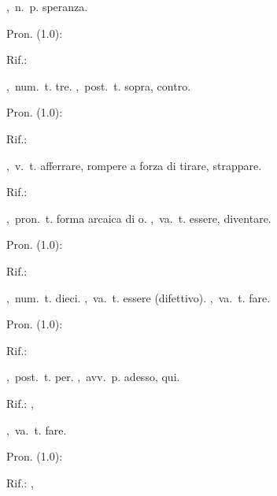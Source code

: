 ,\ n.\ p.
speranza.
\begin{subvocedue}
\item[Pron. (1.0):] 
\item[Rif.:] 
\end{subvocedue}
,\ num.\ t.
tre.
,\ post.\ t.
sopra, contro.
\begin{subvocedue}
\item[Pron. (1.0):] 
\item[Rif.:] 
\end{subvocedue}
,\ v.\ t.
afferrare, rompere a forza di tirare, strappare.
\begin{subvocedue}
\item[Rif.:] 
\end{subvocedue}
,\ pron.\ t.
forma arcaica di o.
,\ va.\ t.
essere, diventare.
\begin{subvocedue}
\item[Pron. (1.0):] 
\item[Rif.:] 
\end{subvocedue}
,\ num.\ t.
dieci.
,\ va.\ t.
essere (difettivo).
,\ va.\ t.
fare.
\begin{subvocedue}
\item[Pron. (1.0):] 
\item[Rif.:] 
\end{subvocedue}
,\ post.\ t.
per.
,\ avv.\ p.
adesso, qui.
\begin{subvocedue}
\item[Rif.:] , 
\end{subvocedue}
,\ va.\ t.
fare.
\begin{subvocedue}
\item[Pron. (1.0):] 
\item[Rif.:] , 
\end{subvocedue}
